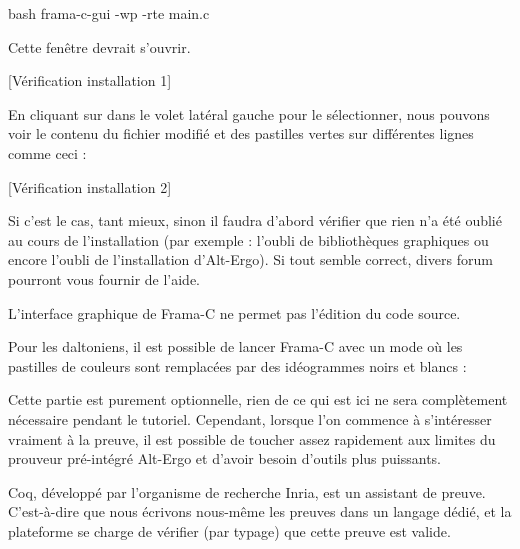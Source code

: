 \begin{CodeBlock}{bash}
frama-c-gui -wp -rte main.c
\end{CodeBlock}



Cette fenêtre devrait s'ouvrir.



[Vérification installation 1]


En cliquant sur  dans le volet latéral gauche pour le sélectionner,
nous pouvons voir le contenu du fichier  modifié et des pastilles 
vertes sur différentes lignes comme ceci :



[Vérification installation 2]


Si c'est le cas, tant mieux, sinon il faudra d'abord vérifier que rien n'a été
oublié au cours de l'installation (par exemple : l'oubli de bibliothèques graphiques
ou encore l'oubli de l'installation d'Alt-Ergo). Si tout semble correct, divers forum
pourront vous fournir de l'aide.



\begin{Warning}
L'interface graphique de Frama-C ne permet pas l'édition du code source.
\end{Warning}


\begin{Information}
Pour les daltoniens, il est possible de lancer Frama-C avec un mode où les 
pastilles de couleurs sont remplacées par des idéogrammes noirs et blancs :

\end{Information}




Cette partie est purement optionnelle, rien de ce qui est ici ne sera 
complètement nécessaire pendant le tutoriel. Cependant, lorsque l'on commence à 
s'intéresser vraiment à la preuve, il est possible de toucher assez rapidement
aux limites du prouveur pré-intégré Alt-Ergo et d'avoir besoin d'outils plus 
puissants.





Coq, développé par l'organisme de recherche Inria, est un assistant de 
preuve. C'est-à-dire que nous écrivons nous-même les preuves dans un 
langage dédié, et la plateforme se charge de vérifier (par typage) que 
cette preuve est valide.



